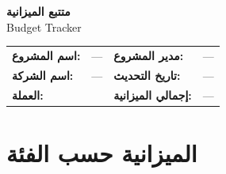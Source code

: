 \documentclass[11pt,a4paper]{article}
\begin{document}
\begin{center}
{\LARGE\bfseries متتبع الميزانية}\\[0.3em]
{\large Budget Tracker}\\[1em]
\end{center}

\begin{table}[H]
\centering
\renewcommand{\arraystretch}{1.4}
\begin{tabularx}{\textwidth}{L{3.5cm} X L{3.5cm} X}
\toprule
\textbf{اسم المشروع:} & --- & \textbf{مدير المشروع:} & --- \\
\textbf{اسم الشركة:} & --- & \textbf{تاريخ التحديث:} & --- \\
\textbf{العملة:} &  & \textbf{إجمالي الميزانية:} & --- \\
\bottomrule
\end{tabularx}
\end{table}

\vspace{1em}

\section{الميزانية حسب الفئة}
\label{sec:budget}
\end{document}
